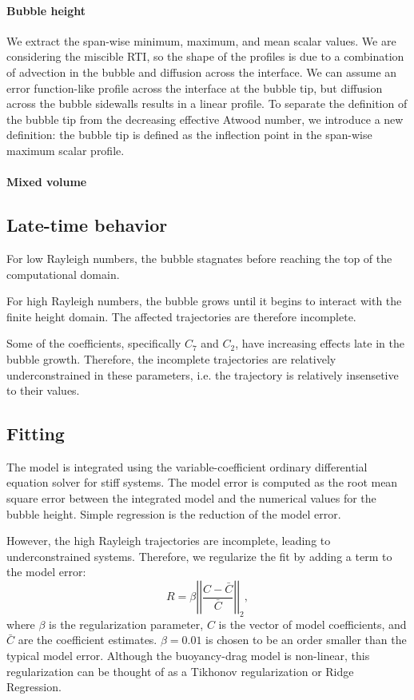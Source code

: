 \paragraph{Bubble height}
We extract the span-wise minimum, maximum, and mean scalar values.
We are considering the miscible RTI, so the shape of the profiles is due to a combination of advection in the bubble and diffusion across the interface.
We can assume an error function-like profile across the interface at the bubble tip, but diffusion across the bubble sidewalls results in a linear profile.
To separate the definition of the bubble tip from the decreasing effective Atwood number, we introduce a new definition: the bubble tip is defined as the inflection point in the span-wise maximum scalar profile.

\paragraph{Mixed volume}

\subsection{Late-time behavior}

For low Rayleigh numbers, the bubble stagnates before reaching the top of the computational domain.

For high Rayleigh numbers, the bubble grows until it begins to interact with the finite height domain.
The affected trajectories are therefore incomplete.

Some of the coefficients, specifically $C_7$ and $C_2$, have increasing effects late in the bubble growth.
Therefore, the incomplete trajectories are relatively underconstrained in these parameters, i.e. the trajectory is relatively insensetive to their values.

\subsection{Fitting}

The model is integrated using the variable-coefficient ordinary differential equation solver for stiff systems.
The model error is computed as the root mean square error between the integrated model and the numerical values for the bubble height.
Simple regression is the reduction of the model error.

However, the high Rayleigh trajectories are incomplete, leading to underconstrained systems.
Therefore, we regularize the fit by adding a term to the model error:
\begin{equation}
R = \beta \left| \left| \frac{C - \bar{C}}{\bar{C}} \right| \right|_2,
\end{equation}
where $\beta$ is the regularization parameter,
$C$ is the vector of model coefficients, and
$\bar{C}$ are the coefficient estimates.
$\beta = 0.01$ is chosen to be an order smaller than the typical model error.
Although the buoyancy-drag model is non-linear, this regularization can be thought of as a Tikhonov regularization or Ridge Regression.

